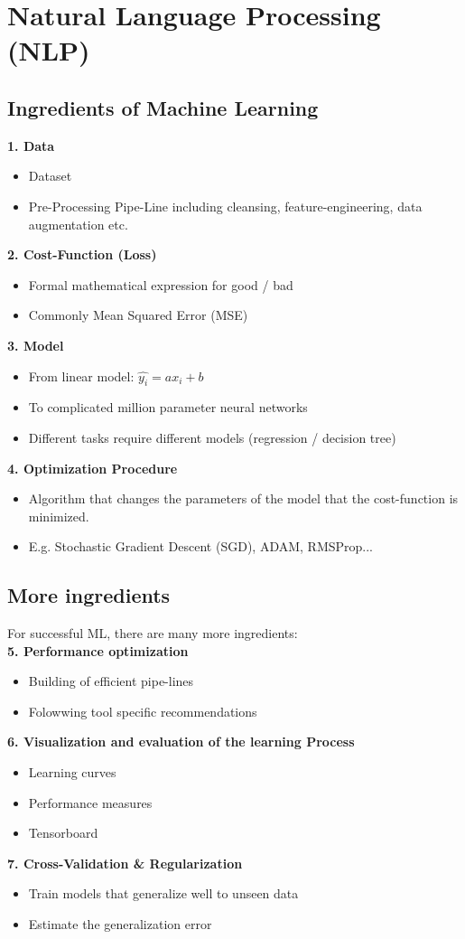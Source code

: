 \section{Natural Language Processing (NLP)}
\subsection{Ingredients of Machine Learning}
\textbf{1. Data}
\begin{itemize}
    \item Dataset
    \item Pre-Processing Pipe-Line including cleansing, feature-engineering, data augmentation etc.
\end{itemize}
\textbf{2. Cost-Function (Loss)}
\begin{itemize}
    \item Formal mathematical expression for good / bad
    \item Commonly Mean Squared Error (MSE)
\end{itemize}
\textbf{3. Model}
\begin{itemize}
    \item From linear model: $\hat{y_i} = ax_i + b$
    \item To complicated million parameter neural networks
    \item Different tasks require different models (regression / decision tree)
\end{itemize}
\textbf{4. Optimization Procedure}
\begin{itemize}
    \item Algorithm that changes the parameters of the model that the cost-function is minimized.
    \item E.g. Stochastic Gradient Descent (SGD), ADAM, RMSProp...
\end{itemize}

\subsection{More ingredients}
For successful ML, there are many more ingredients:\\ 
\textbf{5. Performance optimization}
\begin{itemize}
    \item Building of efficient pipe-lines
    \item Folowwing tool specific recommendations
\end{itemize}
\textbf{6. Visualization and evaluation of the learning Process}
\begin{itemize}
    \item Learning curves
    \item Performance measures
    \item Tensorboard
\end{itemize}
\textbf{7. Cross-Validation \& Regularization}
\begin{itemize}
    \item Train models that generalize well to unseen data
    \item Estimate the generalization error
\end{itemize}

